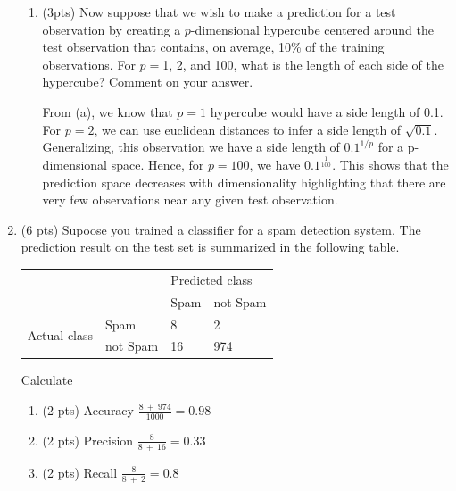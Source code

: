\documentclass[a4paper]{article}
\theoremstyle{definition}
\newenvironment{soln}{
    \leavevmode\color{blue}\ignorespaces
}{}
\begin{document}
\begin{enumerate}
\begin{enumerate}
	\item (3pts) Now suppose that we wish to make a prediction for a test observation by creating a $p$-dimensional hypercube centered around the test observation that contains, on average, 10\% of the training observations. For $p =$1, 2, and 100, what is the length of each side of the hypercube? Comment on your answer.
	
	\begin{soln} From (a), we know that $p=1$ hypercube would have a side length of 0.1. For $p=2$, we can use euclidean distances to infer a side length of $\sqrt{0.1}$. Generalizing, this observation we have a side length of $0.1^{1/p}$ for a p-dimensional space. Hence, for $p=100$, we have $0.1^\frac{1}{100}$. This shows that the prediction space decreases with dimensionality highlighting that there are very few observations near any given test observation.  \end{soln}
	
\end{enumerate}

\item (6 pts) Supoose you trained a classifier for a spam detection system. The prediction result on the test set is summarized in the following table.
\begin{center}
	\begin{tabular}{l l | l l}
		&          & \multicolumn{2}{l}{Predicted class} \\
		&          & Spam           & not Spam           \\
		\hline
		\multirow{2}{*}{Actual class} & Spam     & 8              & 2                  \\
		& not Spam & 16             & 974               
	\end{tabular}
\end{center}

Calculate
\begin{enumerate}
	\item (2 pts) Accuracy
	\begin{soln}   $\frac{8\ +\ 974}{1000} = 0.98$  \end{soln}
	\item (2 pts) Precision
	\begin{soln}  $\frac{8}{8\ +\ 16} = 0.33$  \end{soln}
	\item (2 pts) Recall
	\begin{soln}  $\frac{8}{8\ +\ 2} = 0.8$  \end{soln}
\end{enumerate}



\end{enumerate}
\end{document}

